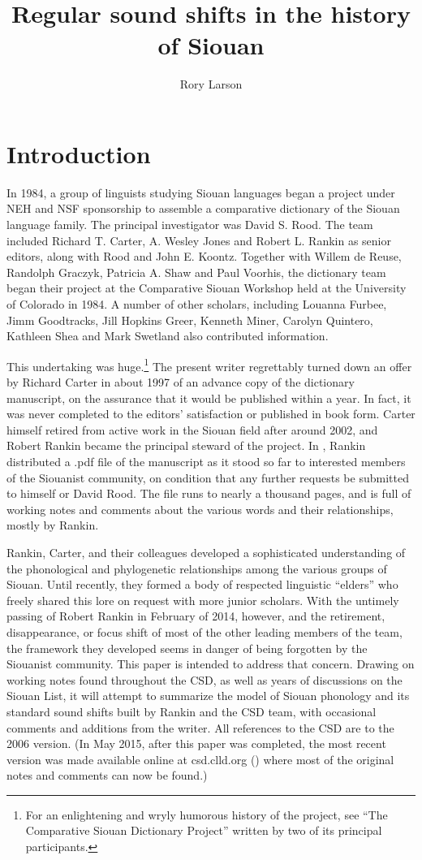 \documentclass[output=paper]{LSP/langsci}
\author{Rory Larson}
\title{Regular sound shifts in the history of Siouan}
\begin{document}
\section{Introduction}  
In 1984, a group of linguists studying Siouan languages began a  project under NEH and NSF sponsorship to assemble a comparative dictionary of the Siouan language family.  The principal investigator was David S. Rood. The team included Richard T. Carter, A. Wesley Jones and Robert L. Rankin as senior editors, along with Rood and John E. Koontz.  Together with Willem de Reuse, Randolph Graczyk, Patricia A. Shaw and Paul Voorhis, the dictionary team began their project at the Comparative Siouan Workshop held at the University of Colorado in 1984.  A number of other scholars, including Louanna Furbee, Jimm Goodtracks, Jill Hopkins Greer, Kenneth Miner, Carolyn Quintero, Kathleen Shea and Mark Swetland also contributed information.

This undertaking was huge.\footnote{For an enlightening and wryly humorous history of the project, see ``The Comparative Siouan Dictionary Project'' \citep{RoodKoontz2002} written by two of its principal participants.} The present writer regrettably turned down an offer by Richard Carter in about 1997 of an advance copy of the dictionary manuscript, on the assurance that it would be published within a year.  In fact, it was never completed to the editors' satisfaction or published in book form. Carter himself retired from active work in the Siouan field after around 2002, and Robert Rankin became the principal steward of the project.  In \citeyear{Rankinetal2006PDF}, Rankin distributed a .pdf file of the manuscript as it stood so far to interested members of the Siouanist community, on condition that any further requests be submitted to himself or David Rood.  The file runs to nearly a thousand pages, and is full of working notes and comments about the various words and their relationships, mostly by Rankin.

Rankin, Carter, and their colleagues developed a sophisticated understanding of the phonological and phylogenetic relationships among the various groups of Siouan.  Until recently, they formed a body of respected linguistic ``elders'' who freely shared this lore on request with more junior scholars.  With the untimely passing of Robert Rankin in February of 2014, however, and the retirement, disappearance, or focus shift of most of the other leading members of the team, the framework they developed seems in danger of being forgotten by the Siouanist community.  This paper is intended to address that concern.  Drawing on working notes found throughout the CSD, as well as years of discussions on the Siouan List, it will attempt to summarize the model of Siouan phonology and its standard sound shifts built by Rankin and the CSD team, with occasional comments and additions from the writer.  All references to the CSD are to the 2006 version. (In May 2015, after this paper was completed, the most recent version was made available online at csd.clld.org (\citealt{RankinEtAl2015}) where most of the original notes and comments can now be found.)
\end{document}
